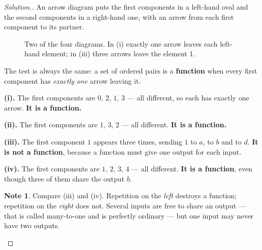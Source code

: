 \documentclass[11pt,a4paper]{article}
\theoremstyle{definition}
\newtheorem{note}[thm]{Note}
\newenvironment{solution}
  {\renewcommand{\qedsymbol}{}\begin{proof}[\textit{Solution}.]}
  {\end{proof}}
\begin{document}
\begin{solution}
An arrow diagram puts the first components in a left-hand oval and the second components
in a right-hand one, with an arrow from each first component to its partner.

\begin{figure}[H]
\centering
{}
\caption{Two of the four diagrams. In (i) exactly one arrow leaves each left-hand element; in (iii) three arrows leave the element 1.}
\end{figure}

The test is always the same: a set of ordered pairs is a \textbf{function} when every
first component has \emph{exactly one} arrow leaving it.

\textbf{(i).} The first components are $0$, $2$, $1$, $3$ --- all different, so each has
exactly one arrow. \textbf{It is a function.}

\textbf{(ii).} The first components are $1$, $3$, $2$ --- all different.
\textbf{It is a function.}

\textbf{(iii).} The first component $1$ appears three times, sending $1$ to $a$, to $b$
and to $d$. \textbf{It is not a function}, because a function must give one output for
each input.

\textbf{(iv).} The first components are $1$, $2$, $3$, $4$ --- all different.
\textbf{It is a function}, even though three of them share the output $b$.

\begin{note}
Compare (iii) and (iv). Repetition on the \emph{left} destroys a function; repetition on
the \emph{right} does not. Several inputs are free to share an output --- that is
called many-to-one and is perfectly ordinary --- but one input may never have two
outputs.
\end{note}
\end{solution}
\end{document}
